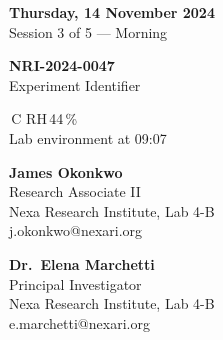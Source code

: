 
\begin{tcolorbox}[
  enhanced,
  colback=InkBlue,
  colframe=InkBlue,
  arc=3pt,
  boxrule=0pt,
  left=12pt, right=12pt,
  top=8pt, bottom=8pt,
  before skip=0pt,
  after skip=14pt,
]
  \begin{minipage}[c]{0.33\linewidth}
    {\color{white}\faCalendar\;
     \textbf{\small Thursday, 14 November 2024}}\\[2pt]
    {\color{LightSteel}\footnotesize Session 3 of 5 — Morning}
  \end{minipage}%
  \hfill
  \begin{minipage}[c]{0.33\linewidth}
    \centering
    {\color{AccentGold}\small\textbf{NRI-2024-0047}}\\[2pt]
    {\color{LightSteel}\footnotesize Experiment Identifier}
  \end{minipage}%
  \hfill
  \begin{minipage}[c]{0.30\linewidth}
    \raggedleft
    {\color{white}\faThermometerHalf{}\,\textdegree C\quad
     \faWind\;RH\,44\,\%}\\[2pt]
    {\color{LightSteel}\footnotesize Lab environment at 09:07}
  \end{minipage}
\end{tcolorbox}

\noindent
\begin{minipage}[t]{0.48\linewidth}
  \begin{tcolorbox}[sideruled, title={\faUser\quad Researcher}]
    \textbf{James Okonkwo}\\
    {\footnotesize\color{Graphite}
      Research Associate II\\
      Nexa Research Institute, Lab 4-B\\
      \faEnvelope\; j.okonkwo@nexari.org
    }
  \end{tcolorbox}
\end{minipage}%
\hfill
\begin{minipage}[t]{0.48\linewidth}
  \begin{tcolorbox}[sideruled, title={\faUserCheck\quad Supervisor / Witness}]
    \textbf{Dr.\ Elena Marchetti}\\
    {\footnotesize\color{Graphite}
      Principal Investigator\\
      Nexa Research Institute, Lab 4-B\\
      \faEnvelope\; e.marchetti@nexari.org
    }
  \end{tcolorbox}
\end{minipage}
